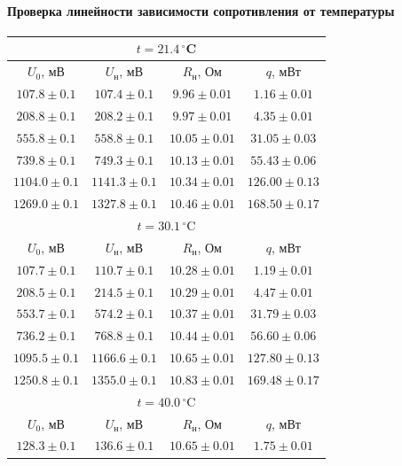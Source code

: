 \documentclass[12pt,a4paper]{scrartcl}
\begin{document}
	\paragraph{Проверка линейности зависимости сопротивления от температуры} \hfill
	\begin{center}
		\begin{tabular}{|c|c|c|c|}
			\hline
			\multicolumn{4}{|c|}{$t = 21.4\,^\circ$C}
			\\\hline
			$U_0$, мВ & $U_{\text{н}}$, мВ & $R_{\text{н}}$, Ом & $q$, мВт
			\\\hline
			$107.8 \pm 0.1$ & $107.4 \pm 0.1$ & $9.96 \pm 0.01$ & $1.16 \pm 0.01$
			\\\hline
			$208.8 \pm 0.1$ & $208.2 \pm 0.1$ & $9.97 \pm 0.01$ & $4.35 \pm 0.01$
			\\\hline
			$555.8 \pm 0.1$ & $558.8 \pm 0.1$ & $10.05 \pm 0.01$ & $31.05 \pm 0.03$
			\\\hline 
			$739.8 \pm 0.1$ & $749.3 \pm 0.1$ & $10.13 \pm 0.01$ & $55.43 \pm 0.06$
			\\\hline
			$1104.0 \pm 0.1$ & $1141.3 \pm 0.1$ & $10.34 \pm 0.01$ & $126.00 \pm 0.13$
			\\\hline
			$1269.0 \pm 0.1$ & $1327.8 \pm 0.1$ & $10.46 \pm 0.01$ & $168.50 \pm 0.17$
			\\\hline
			\multicolumn{4}{|c|}{$t = 30.1\,^\circ$C}
			\\\hline
			$U_0$, мВ & $U_{\text{н}}$, мВ & $R_{\text{н}}$, Ом & $q$, мВт
			\\\hline
			$107.7 \pm 0.1$ & $110.7 \pm 0.1$ & $10.28 \pm 0.01$ & $1.19 \pm 0.01$
			\\\hline
			$208.5 \pm 0.1$ & $214.5 \pm 0.1$ & $10.29 \pm 0.01$ & $4.47 \pm 0.01$
			\\\hline
			$553.7 \pm 0.1$ & $574.2 \pm 0.1$ & $10.37 \pm 0.01$ & $31.79 \pm 0.03$
			\\\hline
			$736.2 \pm 0.1$ & $768.8 \pm 0.1$ & $10.44 \pm 0.01$ & $56.60 \pm 0.06$
			\\\hline
			$1095.5 \pm 0.1$ & $1166.6 \pm 0.1$ & $10.65 \pm 0.01$ & $127.80 \pm 0.13$
			\\\hline
			$1250.8 \pm 0.1$ & $1355.0 \pm 0.1$ & $10.83 \pm 0.01$ & $169.48 \pm 0.17$
			\\\hline
			\multicolumn{4}{|c|}{$t = 40.0\,^\circ$C}
			\\\hline
			$U_0$, мВ & $U_{\text{н}}$, мВ & $R_{\text{н}}$, Ом & $q$, мВт
			\\\hline
			$128.3 \pm 0.1$ & $136.6 \pm 0.1$ & $10.65 \pm 0.01$ & $1.75 \pm 0.01$

\end{tabular}
\end{center}
\end{document}
